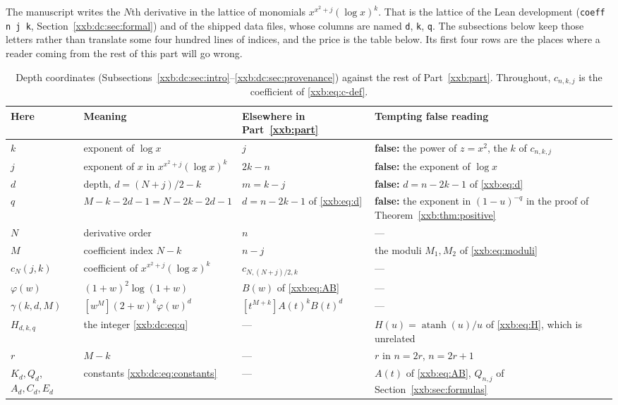 \documentclass[11pt,a4paper]{article}
\numberwithin{equation}{section}
\theoremstyle{definition}
\theoremstyle{remark}
\theoremstyle{plain}
\DeclareMathOperator{\atanh}{atanh}
\begin{document}
The manuscript writes the $N$th derivative in the lattice of monomials
$x^{x^2+j}(\log x)^k$.  That is the lattice of the Lean development
(\texttt{coeff n j k}, Section~\ref{xxb:dc:sec:formal}) and of the shipped
data files, whose columns are named \texttt{d}, \texttt{k}, \texttt{q}.  The
subsections below keep those letters rather than translate some four hundred
lines of indices, and the price is the table below.  Its first four rows are
the places where a reader coming from the rest of this part will go wrong.

\begin{table}[ht]
\centering\small
\caption{Depth coordinates (Subsections~\ref{xxb:dc:sec:intro}--\ref{xxb:dc:sec:provenance})
against the rest of Part~\ref{xxb:part}.  Throughout, $c_{n,k,j}$ is the
coefficient of \eqref{xxb:eq:c-def}.}\label{xxb:dc:tab:notation}
\begin{tabular}{@{}>{\raggedright\arraybackslash}p{}
 >{\raggedright\arraybackslash}p{}
 >{\raggedright\arraybackslash}p{}
 >{\raggedright\arraybackslash}p{}@{}}
\toprule
Here & Meaning & Elsewhere in Part~\ref{xxb:part} & Tempting false reading\\
\midrule
$k$ & exponent of $\log x$ & $j$ &
 \textbf{false:} the power of $z=x^2$, the $k$ of $c_{n,k,j}$\\
$j$ & exponent of $x$ in $x^{x^2+j}(\log x)^k$ & $2k-n$ &
 \textbf{false:} the exponent of $\log x$\\
$d$ & depth, $d=(N+j)/2-k$ & $m=k-j$ &
 \textbf{false:} $d=n-2k-1$ of \eqref{xxb:eq:d}\\
$q$ & $M-k-2d-1=N-2k-2d-1$ & $d=n-2k-1$ of \eqref{xxb:eq:d} &
 \textbf{false:} the exponent in $(1-u)^{-q}$ in the proof of
 Theorem~\ref{xxb:thm:positive}\\
\midrule
$N$ & derivative order & $n$ & ---\\
$M$ & coefficient index $N-k$ & $n-j$ & the moduli $M_1,M_2$ of \eqref{xxb:eq:moduli}\\
$c_N(j,k)$ & coefficient of $x^{x^2+j}(\log x)^k$ & $c_{N,(N+j)/2,k}$ & ---\\
$\varphi(w)$ & $(1+w)^2\log(1+w)$ & $B(w)$ of \eqref{xxb:eq:AB} & ---\\
$\gamma(k,d,M)$ & $[w^M](2+w)^k\varphi(w)^d$ & $[t^{M+k}]A(t)^kB(t)^d$ & ---\\
$H_{d,k,q}$ & the integer \eqref{xxb:dc:eq:q} &
 --- & $H(u)=\atanh(u)/u$ of \eqref{xxb:eq:H}, which is unrelated\\
$r$ & $M-k$ & --- & $r$ in $n=2r$, $n=2r+1$\\
$K_d,Q_d$,\newline $A_d,C_d,E_d$ & constants \eqref{xxb:dc:eq:constants} & --- &
 $A(t)$ of \eqref{xxb:eq:AB}, $Q_{n,j}$ of Section~\ref{xxb:sec:formulas}\\
\bottomrule
\end{tabular}
\end{table}
\end{document}

